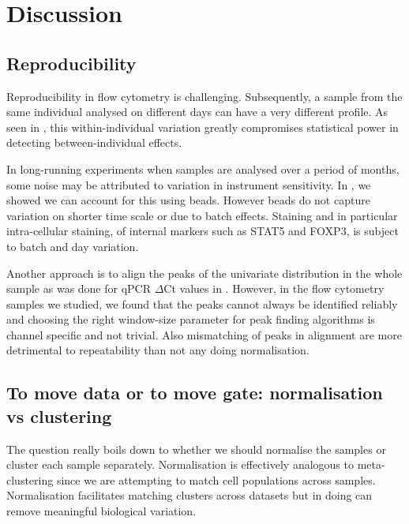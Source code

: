 \chapter{Discussion}

\section{Reproducibility}


Reproducibility in flow cytometry is challenging. 
Subsequently, a sample from the same individual analysed on different days can have a very different profile.
As seen in , this within-individual variation greatly compromises statistical power in detecting between-individual effects.

In long-running experiments when samples are analysed over a period of months, some noise may be attributed to
variation in instrument sensitivity.
In , we showed we can account for this using beads.
However beads do not capture variation on shorter time scale or due to batch effects.
Staining and in particular intra-cellular staining, of internal markers such as STAT5 and FOXP3, is subject to batch and day variation.

Another approach is to align the peaks of the univariate distribution in the whole sample as was done for qPCR $\Delta$Ct values in .
However, in the flow cytometry samples we studied, we found that the peaks cannot always be identified reliably and choosing the right window-size parameter
for peak finding algorithms is channel specific and not trivial.
Also mismatching of peaks in alignment are more detrimental to repeatability than not any doing normalisation.


\section{To move data or to move gate: normalisation vs clustering}

The question really boils down to whether we should normalise the samples or cluster each sample separately.
Normalisation is effectively analogous to meta-clustering since we are attempting to match cell populations across samples.  
Normalisation facilitates matching clusters across datasets but in doing can remove meaningful biological variation.  

